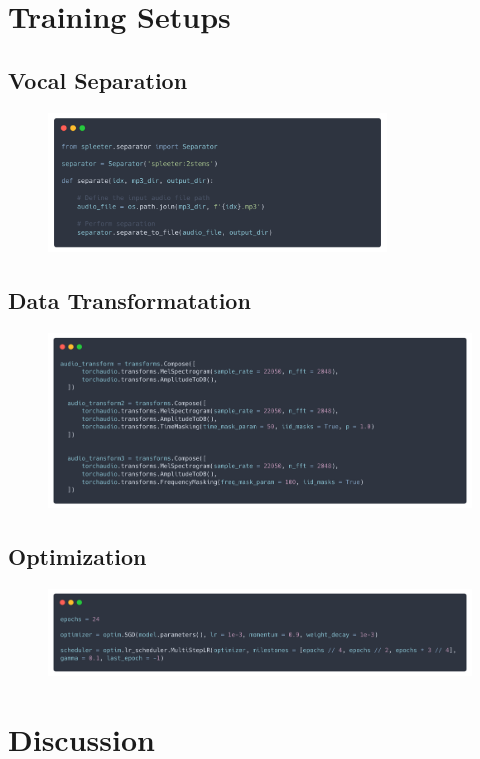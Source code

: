 \documentclass{article}
\begin{document}
    \section{Training Setups}
    \subsection*{Vocal Separation}
    \begin{figure}[hbt!]
        \centering
        \includegraphics[width=0.8\textwidth]{figs/separate.png}
    \end{figure}
    \subsection*{Data Transformatation}
    \begin{figure}[hbt!]
        \centering
        \includegraphics[width=1.0\textwidth]{figs/augment.png}
    \end{figure}
    \subsection*{Optimization}
    \begin{figure}[hbt!]
        \centering
        \includegraphics[width=1.0\textwidth]{figs/optimization.png}
    \end{figure}

    \section{Discussion}
\end{document}
